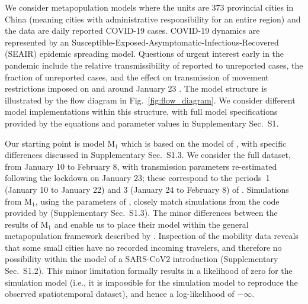 \documentclass[12pt]{article}\usepackage[]{graphicx}\usepackage[]{xcolor}
\newcommand\LiMobility{M$_1$}
\newcommand\suppSecOurModel{S1}
\newcommand\suppSecMobility{S1.2}
\newcommand\suppSecLiModel{S1.3}
\begin{document}
We consider metapopulation models where the units are 373 provincial cities in China (meaning cities with administrative responsibility for an entire region) and the data are daily reported COVID-19 cases. 
COVID-19 dynamics are represented by an Susceptible-Exposed-Asymptomatic-Infectious-Recovered (SEAIR) epidemic spreading model. 
Questions of urgent interest early in the pandemic include the relative transmissibility of reported to unreported cases, the fraction of unreported cases, and the effect on transmission of movement restrictions imposed on and around January 23 \cite{li20}.
The model structure is illustrated by the flow diagram in Fig.~\ref{fig:flow_diagram}.
We consider different model implementations within this structure, with full model specifications provided by the equations and parameter values in Supplementary Sec.~\suppSecOurModel.

Our starting point is model {\LiMobility} which is based on the model of \cite{li20}, with specific differences discussed in Supplementary Sec.~\suppSecLiModel.
We consider the full dataset, from January 10 to February 8, with transmission parameters re-estimated following the lockdown on January 23; these correspond to the periods~1 (January 10 to January 22) and 3 (January 24 to February 8) of \cite{li20}.
Simulations from {\LiMobility}, using the parameters of \citep{li20}, closely match simulations from the code provided by \cite{li20} (Supplementary Sec.~\suppSecLiModel).
The minor differences between the results of {\LiMobility} and \citep{li20} enable us to place their model within the general metapopulation framework described by \citep{ionides21}.
Inspection of the mobility data reveals that some small cities have no recorded incoming travelers, and therefore no possibility within the model of a SARS-CoV2 introduction (Supplementary Sec.~\suppSecMobility).
This minor limitation formally results in a likelihood of zero for the simulation model (i.e., it is impossible for the simulation model to reproduce the observed spatiotemporal dataset), and hence a log-likelihood of $-\infty$.
\end{document}
